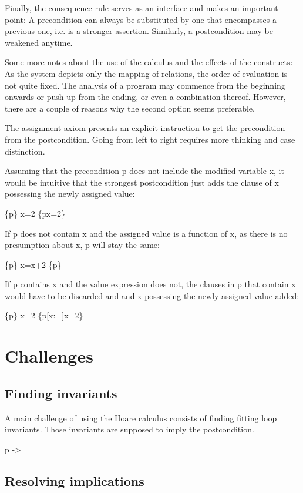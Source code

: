 Finally, the consequence rule serves as an interface and makes an important point: A precondition can always be substituted by one that encompasses a previous one, i.e. is a stronger assertion. Similarly, a postcondition may be weakened anytime.

Some more notes about the use of the calculus and the effects of the constructs:
As the system depicts only the mapping of relations, the order of evaluation is not quite fixed. The analysis of a program may commence from the beginning onwards or push up from the ending, or even a combination thereof. However, there are a couple of reasons why the second option seems preferable.

The assignment axiom presents an explicit instruction to get the precondition from the postcondition. Going from left to right requires more thinking and case distinction.

Assuming that the precondition p does not include the modified variable x, it would be intuitive that the strongest postcondition just adds the clause of x possessing the newly assigned value:
\begin{hoare}
\{p\} x=2 \{p\wedge x=2\}
\end{hoare}

If p does not contain x and the assigned value is a function of x, as there is no presumption about x, p will stay the same:
\begin{hoare}
\{p\} x=x+2 \{p\}
\end{hoare}

If p contains x and the value expression does not, the clauses in p that contain x would have to be discarded and and x possessing the newly assigned value added:
\begin{hoare}
\{p\} x=2 \{p[x:=]\wedge x=2\}
\end{hoare}

\section{Challenges}
\subsection{Finding invariants}

A main challenge of using the Hoare calculus consists of finding fitting loop invariants. Those invariants are supposed to imply the postcondition.

p -> 

\subsection{Resolving implications}

